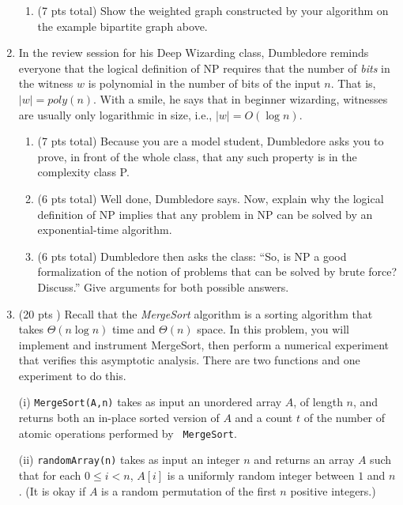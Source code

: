 \documentclass[12pt]{article}
\begin{document}
\begin{enumerate}
\begin{enumerate}
\item (7 pts total) \label{1c} Show the weighted graph constructed by your algorithm on the example bipartite graph above.
\pagebreak

\end{enumerate}
	
\item In the review session for his Deep Wizarding class,
    Dumbledore reminds everyone that the logical definition of NP requires that
        the number of \textit{bits} in the witness $w$ is polynomial in the
        number of bits of the input $n$. That is, $|w| = poly(n)$. With a
        smile, he says that in beginner wizarding, witnesses are usually only
        logarithmic in size, i.e., $|w| = O(\log n)$.  \begin{enumerate} 
\pagebreak
\item (7 pts total)  \label{2a} Because you are a model student, Dumbledore asks you to prove, in front
    of the whole class, that any such property is in the complexity class P.
\pagebreak

\item (6 pts total) \label{2b} Well done, Dumbledore says. Now, explain why the logical definition of NP
    implies that any problem in NP can be solved by an exponential-time
    algorithm.
\pagebreak

\item (6 pts total) \label{2c} Dumbledore then asks the class: ``So, is NP a good formalization of the
    notion of problems that can be solved by brute force?  Discuss.'' Give
    arguments for both possible answers.
\pagebreak

\end{enumerate}

\item (20 pts ) Recall that the \textit{MergeSort} algorithm is a sorting
algorithm that takes $\Theta(n\log n)$ time and $\Theta(n)$ space. In this
problem, you will implement and instrument MergeSort, then perform a
numerical experiment that verifies this asymptotic analysis. There are two
functions and one experiment to do this.
	
        (i) {\tt MergeSort(A,n)} takes as input an unordered array $A$, of
        length $n$, and returns both an in-place sorted version of $A$ and a
        count $t$ of the number of atomic operations performed by {\tt
        MergeSort}.
	
        (ii) {\tt randomArray(n)} takes as input an integer $n$ and returns an
        array $A$ such that for each $0 \leq i < n$, $A[i]$ is a uniformly
        random integer between $1$ and $n$. (It is okay if $A$ is a random
        permutation of the first $n$ positive integers.)
\pagebreak
		

\end{enumerate}
\end{document}
